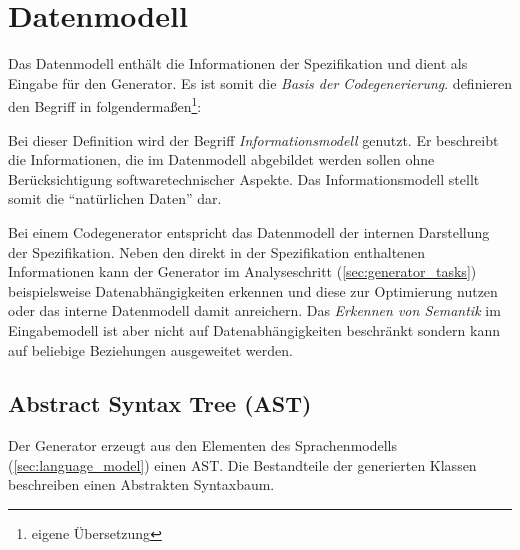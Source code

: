 \section{Datenmodell}
\label{sec:datamodel}

Das Datenmodell enthält die Informationen der Spezifikation und dient als Eingabe für den Generator. Es ist somit die \emph{Basis der Codegenerierung}. \citeauthor{rfc3198} definieren den Begriff in \cite{rfc3198} folgendermaßen\footnote{eigene Übersetzung}:


Bei dieser Definition wird der Begriff \emph{Informationsmodell} genutzt. Er beschreibt die Informationen, die im Datenmodell abgebildet werden sollen ohne Berücksichtigung softwaretechnischer Aspekte. Das Informationsmodell stellt somit die \enquote{natürlichen Daten} dar.

Bei einem Codegenerator entspricht das Datenmodell der internen Darstellung der Spezifikation. Neben den direkt in der Spezifikation enthaltenen Informationen kann der Generator im Analyseschritt (\cref{sec:generator_tasks}) beispielsweise Datenabhängigkeiten erkennen und diese zur Optimierung nutzen oder das interne Datenmodell damit anreichern. Das \emph{Erkennen von Semantik} im Eingabemodell ist aber nicht auf Datenabhängigkeiten beschränkt sondern kann auf beliebige Beziehungen ausgeweitet werden. 

\subsection{Abstract Syntax Tree (AST)}
\label{sec:ast}

Der Generator erzeugt aus den Elementen des Sprachenmodells (\cref{sec:language_model}) einen \gls{AST}. 
Die Bestandteile der generierten Klassen beschreiben einen Abstrakten Syntaxbaum.

